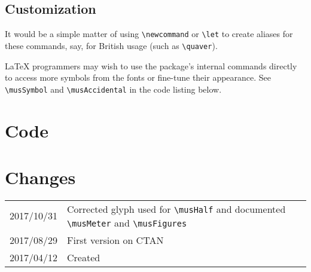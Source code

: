 \documentclass{article}
\begin{document}
\subsection{Customization}

It would be a simple matter of using \verb|\newcommand| or \verb|\let| to create
aliases for these commands, say, for British usage (such as \verb|\quaver|).

\LaTeX{} programmers may wish to use the package's internal commands directly to
access more symbols from the fonts or fine-tune their appearance.
See \verb|\musSymbol| and \verb|\musAccidental| in the code listing below. 

\section{Code}


\section{Changes}

\begin{tabular}{r p{}}
    2017/10/31 & Corrected glyph used for \verb|\musHalf| and documented
    \verb|\musMeter| and \verb|\musFigures|\\
    2017/08/29 & First version on CTAN\\
    2017/04/12 & Created\\
\end{tabular}
\end{document}
